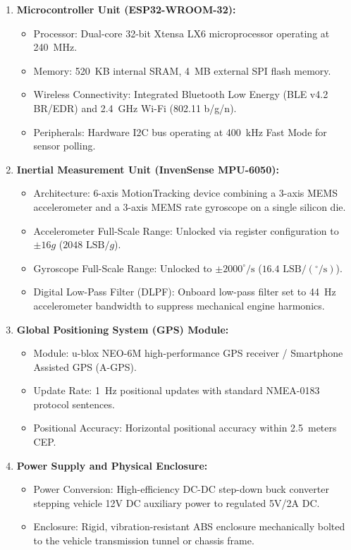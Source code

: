 \begin{enumerate}
    \item \textbf{Microcontroller Unit (ESP32-WROOM-32):}
    \begin{itemize}
        \item Processor: Dual-core 32-bit Xtensa LX6 microprocessor operating at 240~MHz.
        \item Memory: 520~KB internal SRAM, 4~MB external SPI flash memory.
        \item Wireless Connectivity: Integrated Bluetooth Low Energy (BLE v4.2 BR/EDR) and 2.4~GHz Wi-Fi (802.11 b/g/n).
        \item Peripherals: Hardware I2C bus operating at 400~kHz Fast Mode for sensor polling.
    \end{itemize}
    
    \item \textbf{Inertial Measurement Unit (InvenSense MPU-6050):}
    \begin{itemize}
        \item Architecture: 6-axis MotionTracking device combining a 3-axis MEMS accelerometer and a 3-axis MEMS rate gyroscope on a single silicon die.
        \item Accelerometer Full-Scale Range: Unlocked via register configuration to $\pm 16g$ ($2048\text{ LSB}/g$).
        \item Gyroscope Full-Scale Range: Unlocked to $\pm 2000^\circ/\text{s}$ ($16.4\text{ LSB}/(^\circ/\text{s})$).
        \item Digital Low-Pass Filter (DLPF): Onboard low-pass filter set to 44~Hz accelerometer bandwidth to suppress mechanical engine harmonics.
    \end{itemize}
    
    \item \textbf{Global Positioning System (GPS) Module:}
    \begin{itemize}
        \item Module: u-blox NEO-6M high-performance GPS receiver / Smartphone Assisted GPS (A-GPS).
        \item Update Rate: 1~Hz positional updates with standard NMEA-0183 protocol sentences.
        \item Positional Accuracy: Horizontal positional accuracy within 2.5~meters CEP.
    \end{itemize}
    
    \item \textbf{Power Supply and Physical Enclosure:}
    \begin{itemize}
        \item Power Conversion: High-efficiency DC-DC step-down buck converter stepping vehicle 12V DC auxiliary power to regulated 5V/2A DC.
        \item Enclosure: Rigid, vibration-resistant ABS enclosure mechanically bolted to the vehicle transmission tunnel or chassis frame.
    \end{itemize}
\end{enumerate}

